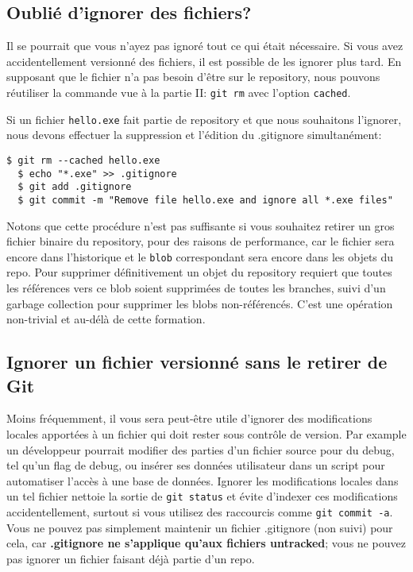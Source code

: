 \documentclass{../../common/tufte-latex/tufte-handout}
\begin{document}
\subsection{Oublié d'ignorer des fichiers?}
Il se pourrait que vous n'ayez pas ignoré tout ce qui était nécessaire.
Si vous avez accidentellement versionné des fichiers, il est possible de les ignorer plus tard.
En supposant que le fichier n'a pas besoin d'être sur le repository, nous pouvons réutiliser la commande vue à la partie II: \texttt{git rm} avec l'option \texttt{cached}.

Si un fichier \texttt{hello.exe} fait partie de repository et que nous souhaitons l'ignorer, nous devons effectuer la suppression et l'édition du .gitignore simultanément: 
\begin{lstlisting}[style=BashInputStyle]
  $ git rm --cached hello.exe
  $ echo "*.exe" >> .gitignore
  $ git add .gitignore
  $ git commit -m "Remove file hello.exe and ignore all *.exe files"
\end{lstlisting}

Notons que cette procédure n'est pas suffisante si vous souhaitez retirer un gros fichier binaire du repository, pour des raisons de performance, car le fichier sera encore dans l'historique et le \texttt{blob} correspondant sera encore dans les objets du repo.
Pour supprimer définitivement un objet du repository requiert que toutes les références vers ce blob soient supprimées de toutes les branches, suivi d'un garbage collection pour supprimer les blobs non-référencés.
C'est une opération non-trivial et au-délà de cette formation.

\subsection{Ignorer un fichier versionné sans le retirer de Git}
Moins fréquemment, il vous sera peut-être utile d'ignorer des modifications locales apportées à un fichier qui doit rester sous contrôle de version.
Par example un développeur pourrait modifier des parties d'un fichier source pour du debug, tel qu'un flag de debug, ou insérer ses données utilisateur dans un script pour automatiser l'accès à une base de données.
Ignorer les modifications locales dans un tel fichier nettoie la sortie de \texttt{git status} et évite d'indexer ces modifications accidentellement, surtout si vous utilisez des raccourcis comme \texttt{git commit -a}. 
Vous ne pouvez pas simplement maintenir un fichier .gitignore (non suivi) pour cela, car \textbf{.gitignore ne s'applique qu'aux fichiers untracked}; vous ne pouvez pas ignorer un fichier faisant déjà partie d'un repo.
\end{document}
